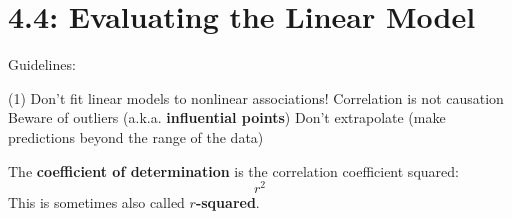 \documentclass[../mathNotesPreamble]{subfiles}
\providecommand{\relscalefact}{1.4}
\begin{document}
\relscale{\relscalefact}
  \section{4.4: Evaluating the Linear Model}
    Guidelines:
    \begin{tasks}[after-item-skip=\stretch{1}, label=\textbullet](1)
      \task Don't fit linear models to nonlinear associations!
      \task Correlation is not causation
      \task Beware of outliers (a.k.a. \textbf{influential points})
      \task Don't extrapolate (make predictions beyond the range of the data)
    \end{tasks}

    \begin{defn*}
      The \textbf{coefficient of determination} is the correlation coefficient squared:
        \[r^2\]
      This is sometimes also called \textbf{$r$-squared}.
    \end{defn*}

  \pagebreak
\end{document}
